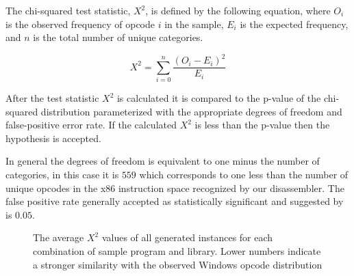 
    The chi-squared test statistic, $X^2$, is defined by the following
    equation, where $O_i$ is the observed frequency of opcode $i$ in the
    sample, $E_i$ is the expected frequency, and $n$ is the total number of
    unique categories.

    $$X^2 = \sum_{i=0}^{n} \frac{(O_i - E_i)^2}{E_i}$$

    After the test statistic $X^2$ is calculated it is compared to the
    p-value of the chi-squared distribution parameterized with the
    appropriate degrees of freedom and false-positive error rate. If the
    calculated $X^2$ is less than the p-value then the hypothesis is
    accepted.

    In general the degrees of freedom is equivalent to one minus the number of
    categories, in this case it is $559$ which corresponds to one less than the
    number of unique opcodes in the x86 instruction space recognized by our
    disassembler. The false positive rate generally accepted as statistically
    significant and suggested by \cite{chisquared} is $0.05$.

    \begin{figure}[t!]
        \vspace{-50pt}
        \caption[Results for blending in with benign programs]
        {The average $X^2$ values of all generated instances for each
        combination of sample program and library. Lower numbers indicate a
        stronger similarity with the observed Windows opcode distribution}
        \label{tab:results-windows-like-avg}
    \end{figure}


